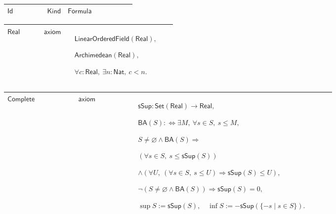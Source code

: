 \documentclass[12pt,reqno]{amsart}
\theoremstyle{blueplain}
\numberwithin{equation}{section}
\newlength{\FTCOneColumnBody}
\begin{document}
{\scriptsize {\ }}

{\scriptsize \setlength{\parskip}{0pt}\nointerlineskip
\noindent 
\begin{tabular}{|@{}>{\centering\arraybackslash}m{\FTCOneColumnBody}|}
\hline
$\displaystyle \mathsf{Foundations}$ \\ \hline
\end{tabular}%
}

{\scriptsize \setlength{\parskip}{0pt}\nointerlineskip
\noindent 
\begin{tabular}{|@{}>{\centering\arraybackslash}m{0.19251\linewidth}|>{\centering\arraybackslash}m{0.16845\linewidth}|>{\centering\arraybackslash}m{0.53904\linewidth}|}
\hline
$\displaystyle \mathsf{Id}$ & $\displaystyle \mathsf{Kind}$ & $\displaystyle 
\mathsf{Formula}$ \\ \hline
\end{tabular}%
}

{\scriptsize \setlength{\parskip}{0pt}\nointerlineskip
\noindent 
\begin{tabular}{|@{}>{\centering\arraybackslash}m{0.19251\linewidth}|>{\centering\arraybackslash}m{0.16845\linewidth}|>{\centering\arraybackslash}m{0.53904\linewidth}|}
\hline
\hypertarget{ax:Real}{$\displaystyle \mathsf{Real}$} & $\displaystyle 
\mathsf{axiom}$ & $\displaystyle \mathsf{LinearOrderedField}(\mathsf{Real}),$%
\par$\displaystyle \mathsf{Archimedean}(\mathsf{Real}),$\par$\displaystyle %
\forall c:\mathsf{Real},\ \exists n:\mathsf{Nat},\ c<n.$ \\ \hline
\end{tabular}%
}

{\scriptsize \setlength{\parskip}{0pt}\nointerlineskip
\noindent 
\begin{tabular}{|@{}>{\centering\arraybackslash}m{0.19251\linewidth}|>{\centering\arraybackslash}m{0.16845\linewidth}|>{\centering\arraybackslash}m{0.53904\linewidth}|}
\hline
\hypertarget{ax:Complete}{$\displaystyle \mathsf{Complete}$} & $%
\displaystyle \mathsf{axiom}$ & $\displaystyle \mathsf{sSup}:\mathsf{Set}(%
\mathsf{Real})\to\mathsf{Real},$\par$\displaystyle \mathsf{BA}%
(S):\Longleftrightarrow\exists M,\ \forall s\in S,\ s\le M,$\par$%
\displaystyle S\ne\varnothing\land\mathsf{BA}(S)\Rightarrow$\par$%
\displaystyle (\forall s\in S,\ s\le\mathsf{sSup}(S))$\par$\displaystyle %
\land(\forall U,\ (\forall s\in S,\ s\le U)\Rightarrow\mathsf{sSup}(S)\le
U), $\par$\displaystyle \neg(S\ne\varnothing\land\mathsf{BA}(S))\Rightarrow%
\mathsf{sSup}(S)=0,$\par$\displaystyle \sup S:=\mathsf{sSup}(S),\quad\inf
S:=-\mathsf{sSup}(\{-s\mid s\in S\}).$ \\ \hline
\end{tabular}%
}
\end{document}
